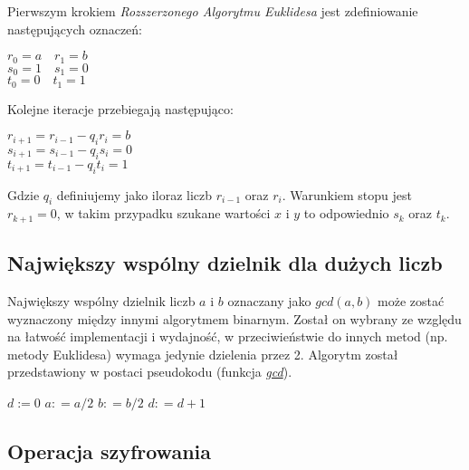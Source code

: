 \documentclass[10pt,a4paper]{article}
\begin{document}
Pierwszym krokiem \textit{Rozszerzonego Algorytmu Euklidesa} jest zdefiniowanie następujących oznaczeń:

\begin{center}
$r_{0} = a \quad r_{1} = b$\\
$s_{0} = 1 \quad s_{1} = 0$\\
$t_{0} = 0 \quad t_{1} = 1$
\end{center}

Kolejne iteracje przebiegają następująco:

\begin{center}
$r_{i+1} = r_{i-1} - q_{i} r_{i} = b$\\
$s_{i+1} = s_{i-1} - q_{i} s_{i} = 0$\\
$t_{i+1} = t_{i-1} - q_{i} t_{i} = 1$
\end{center}

Gdzie $q_i$ definiujemy jako iloraz liczb $r_{i-1}$ oraz $r_i$. Warunkiem stopu jest $r_{k+1} = 0$, w takim przypadku szukane wartości $x$ i $y$ to odpowiednio $s_k$ oraz $t_k$. 
 
\subsection{Największy wspólny dzielnik dla dużych liczb}
Największy wspólny dzielnik liczb $a$ i $b$ oznaczany jako $gcd(a,b)$ może zostać wyznaczony między innymi algorytmem binarnym. Został on wybrany ze względu na łatwość implementacji i wydajność, w przeciwieństwie do innych metod (np. metody Euklidesa) wymaga jedynie dzielenia przez 2. Algorytm został przedstawiony w postaci pseudokodu (funkcja \hyperref[fun_gcd]{\textit{gcd}}).

\begin{algorithm} \label{fun_gcd}
\begin{algorithmic}[1]
\State $d := 0$
	\State $a : =a/2$
	\State $b : =b/2$
	\State $d : = d + 1$
\EndWhile

	   
	   
	  
	 \Else {}
	 \EndIf
\EndWhile

\State {}
\EndFunction
\end{algorithmic}
\end{algorithm}


\subsection{Operacja szyfrowania}
\end{document}
